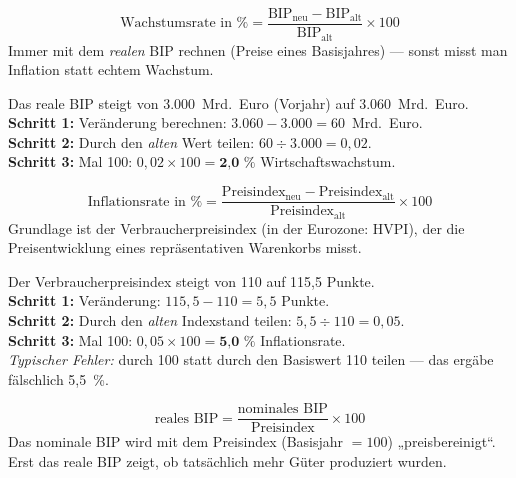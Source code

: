\documentclass[11pt, a4paper]{article}
\begin{document}
\begin{merksatz}[title={\bfseries Formel 1: Wirtschaftswachstum (Veränderungsrate des realen BIP)}]
\[
\text{Wachstumsrate in \%} =
\frac{\text{BIP}_{\text{neu}} - \text{BIP}_{\text{alt}}}{\text{BIP}_{\text{alt}}} \times 100
\]
Immer mit dem \emph{realen} BIP rechnen (Preise eines Basisjahres) --- sonst misst man
Inflation statt echtem Wachstum.
\end{merksatz}

\begin{beispiel}
Das reale BIP steigt von 3.000~Mrd.~Euro (Vorjahr) auf 3.060~Mrd.~Euro.\\[0.3em]
\textbf{Schritt 1:} Veränderung berechnen: $3.060 - 3.000 = 60$~Mrd.~Euro.\\
\textbf{Schritt 2:} Durch den \emph{alten} Wert teilen: $60 \div 3.000 = 0{,}02$.\\
\textbf{Schritt 3:} Mal 100: $0{,}02 \times 100 = \textbf{2{,}0~\%}$ Wirtschaftswachstum.
\end{beispiel}

\begin{merksatz}[title={\bfseries Formel 2: Inflationsrate (Veränderungsrate des Preisindex)}]
\[
\text{Inflationsrate in \%} =
\frac{\text{Preisindex}_{\text{neu}} - \text{Preisindex}_{\text{alt}}}{\text{Preisindex}_{\text{alt}}} \times 100
\]
Grundlage ist der Verbraucherpreisindex (in der Eurozone: HVPI), der die Preisentwicklung
eines repräsentativen Warenkorbs misst.
\end{merksatz}

\begin{beispiel}
Der Verbraucherpreisindex steigt von 110 auf 115,5 Punkte.\\[0.3em]
\textbf{Schritt 1:} Veränderung: $115{,}5 - 110 = 5{,}5$ Punkte.\\
\textbf{Schritt 2:} Durch den \emph{alten} Indexstand teilen: $5{,}5 \div 110 = 0{,}05$.\\
\textbf{Schritt 3:} Mal 100: $0{,}05 \times 100 = \textbf{5{,}0~\%}$ Inflationsrate.\\[0.3em]
\emph{Typischer Fehler:} durch 100 statt durch den Basiswert 110 teilen --- das ergäbe
fälschlich 5,5~\%.
\end{beispiel}

\begin{merksatz}[title={\bfseries Formel 3: Deflationierung --- vom nominalen zum realen BIP}]
\[
\text{reales BIP} =
\frac{\text{nominales BIP}}{\text{Preisindex}} \times 100
\]
Das nominale BIP wird mit dem Preisindex (Basisjahr $=100$) „preisbereinigt``. Erst das
reale BIP zeigt, ob tatsächlich mehr Güter produziert wurden.
\end{merksatz}
\end{document}
